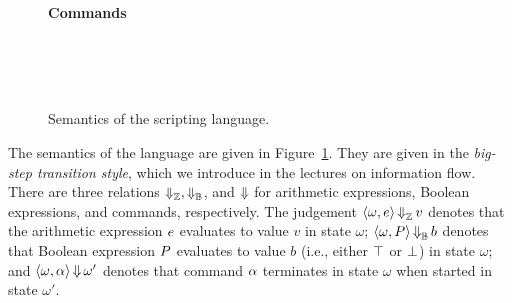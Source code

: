 \documentclass[11pt]{article}
\begin{document}
\begin{figure}[t]
\textbf{Commands}
\begin{center}
\quad
{}
\quad
{}
\\[1ex]
\quad
{}
\\[1ex]
\quad
{}
\quad
{}
\\[1ex]
\quad
{}
\end{center}

\caption{Semantics of the scripting language.}
\label{fig:semantics}
\end{figure}

The semantics of the language are given in Figure~\ref{fig:semantics}. They are given in the \emph{big-step transition style}, which we introduce in the lectures on information flow. There are three relations $\operatorname{\Downarrow}_{\mathbb{Z}}, \operatorname{\Downarrow}_{\mathbb{B}}$, and $\operatorname{\Downarrow}$ for arithmetic expressions, Boolean expressions, and commands, respectively. The judgement $\langle\omega,e\rangle \operatorname{\Downarrow}_{\mathbb{Z}} v$ denotes that the arithmetic expression $e$ evaluates to value $v$ in state $\omega$; $\langle\omega,P\rangle \operatorname{\Downarrow}_{\mathbb{B}} b$ denotes that Boolean expression $P$ evaluates to value $b$ (i.e., either $\top$ or $\bot$) in state $\omega$; and $\langle\omega,\alpha\rangle\operatorname{\Downarrow}\omega'$ denotes that command $\alpha$ terminates in state $\omega$ when started in state $\omega'$.
\end{document}

